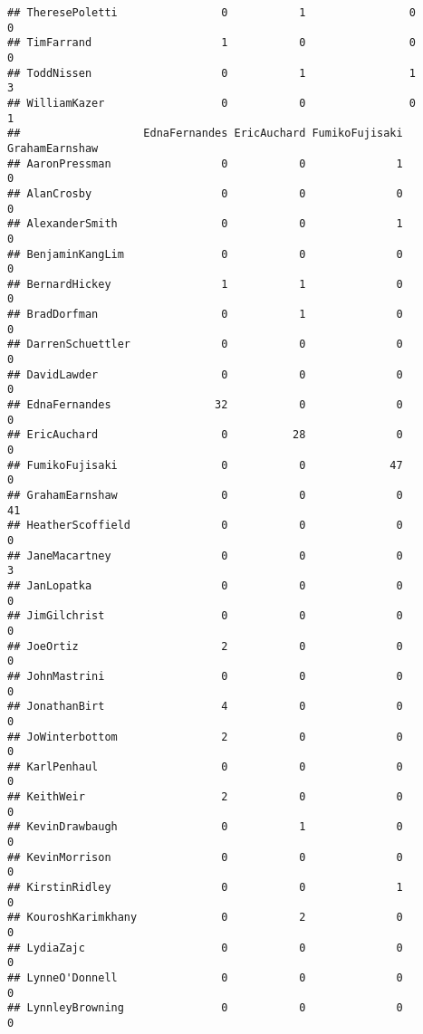 \documentclass[
  12pt,
]{article}
\begin{document}
\begin{verbatim}
## TheresePoletti                0           1                0           0
## TimFarrand                    1           0                0           0
## ToddNissen                    0           1                1           3
## WilliamKazer                  0           0                0           1
##                   EdnaFernandes EricAuchard FumikoFujisaki GrahamEarnshaw
## AaronPressman                 0           0              1              0
## AlanCrosby                    0           0              0              0
## AlexanderSmith                0           0              1              0
## BenjaminKangLim               0           0              0              0
## BernardHickey                 1           1              0              0
## BradDorfman                   0           1              0              0
## DarrenSchuettler              0           0              0              0
## DavidLawder                   0           0              0              0
## EdnaFernandes                32           0              0              0
## EricAuchard                   0          28              0              0
## FumikoFujisaki                0           0             47              0
## GrahamEarnshaw                0           0              0             41
## HeatherScoffield              0           0              0              0
## JaneMacartney                 0           0              0              3
## JanLopatka                    0           0              0              0
## JimGilchrist                  0           0              0              0
## JoeOrtiz                      2           0              0              0
## JohnMastrini                  0           0              0              0
## JonathanBirt                  4           0              0              0
## JoWinterbottom                2           0              0              0
## KarlPenhaul                   0           0              0              0
## KeithWeir                     2           0              0              0
## KevinDrawbaugh                0           1              0              0
## KevinMorrison                 0           0              0              0
## KirstinRidley                 0           0              1              0
## KouroshKarimkhany             0           2              0              0
## LydiaZajc                     0           0              0              0
## LynneO'Donnell                0           0              0              0
## LynnleyBrowning               0           0              0              0

\end{verbatim}
\end{document}
